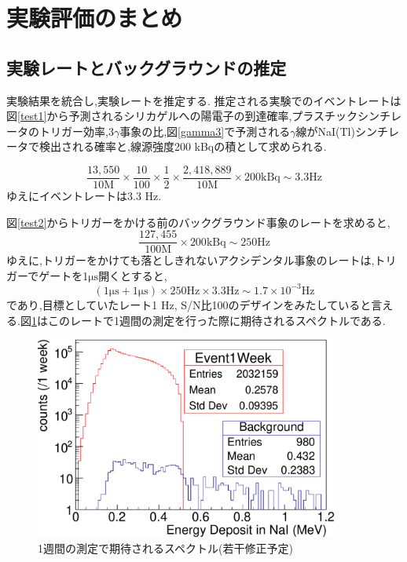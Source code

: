\section{実験評価のまとめ}
\label{section_testall}

\subsection{実験レートとバックグラウンドの推定}
実験結果を統合し,実験レートを推定する.
推定される実験でのイベントレートは図\ref{test1}から予測されるシリカゲルへの陽電子の到達確率,プラスチックシンチレータのトリガー効率,$3\gamma$事象の比,図\ref{gamma3}で予測される$\gamma$線がNaI(Tl)シンチレータで検出される確率と,線源強度200 kBqの積として求められる.

\begin{equation}
	\nonumber
	\frac{13,550}{10 \mathrm{M}} \times \frac{10}{100} \times \frac{1}{2} \times \frac{2,418,889}{10 \mathrm{M}} \times 200 \mathrm{kBq} \sim 3.3 \mathrm{Hz}
\end{equation}
ゆえにイベントレートは3.3 Hz.

図\ref{test2}からトリガーをかける前のバックグラウンド事象のレートを求めると,
\begin{equation}
	\nonumber
	\frac{127,455}{100\mathrm{M}} \times 200 \mathrm{kBq} \sim 250 \mathrm{ Hz}
\end{equation}
ゆえに,トリガーをかけても落としきれないアクシデンタル事象のレートは,トリガーでゲートを1$\si{\micro \second}$開くとすると,
\begin{equation}
	\nonumber
	( 1 \si{\micro \second} + 1 \si{\micro \second}) \times  250 \mathrm{Hz} \times 3.3 \mathrm{Hz} \sim 1.7 \times 10^{-3} \mathrm{Hz}
\end{equation}
であり,目標としていたレート1 Hz, S/N比100のデザインをみたしていると言える.図\ref{test_all}はこのレートで1週間の測定を行った際に期待されるスペクトルである.

\begin{figure}[htbp]
	\centering
		\includegraphics[width=10cm]{fig/test_all.pdf}
	\caption{1週間の測定で期待されるスペクトル(若干修正予定)}
	\label{test_all}
\end{figure}


